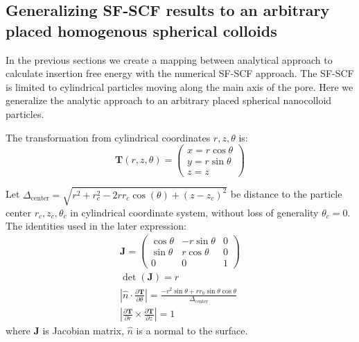 \documentclass[10pt, a4paper]{article}
\newcommand\todo[1]{\textcolor{red}{#1}}
\begin{document}
\subsection*{Generalizing SF-SCF results to an arbitrary placed homogenous spherical colloids}
\begin{multicols}{2}

In the previous sections we create a mapping between analytical approach to calculate insertion free energy with the numerical SF-SCF approach. The SF-SCF is limited to cylindrical particles moving along the main axis of the pore.
Here we generalize the analytic approach to an arbitrary placed spherical nanocolloid particles.



The transformation from cylindrical coordinates $r, z, \theta$ is:
\begin{equation}
    \bm{T}(r, z, \theta) = 
    \begin{pmatrix}
        x = r \cos \theta\\
        y = r \sin \theta\\
        z = z
    \end{pmatrix}
\end{equation}

Let $\Delta_{\textrm{center}} = \sqrt{r^2 + r_c^2 - 2 r r_c \cos(\theta) + (z-z_c)^2}$ be distance to the particle center $r_c, z_c, \theta_c$ in cylindrical coordinate system, without loss of generality $\theta_c = 0$.
The identities used in the later expression:
\begin{gather}
    \bm{J} = 
    \begin{pmatrix}
        \cos{\theta} & -r\sin\theta & 0 \\
        \sin{\theta} &  r\cos\theta & 0 \\
        0           & 0            & 1
    \end{pmatrix}\\
    \det(\bm{J}) = r \\
    \left| \hat{n} \cdot \frac{\partial \bm{T}}{\partial \theta} \right| = \frac{-r^2 \sin \theta + rr_0 \sin \theta \cos \theta}{\Delta_{\textrm{center}}}\\
    \left| \frac{\partial \bm{T}}{\partial r} \times \frac{\partial \bm{T}}{\partial z} \right| = 1
\end{gather}
where $\bm{J}$ is Jacobian matrix, $\hat{n}$ is a normal to the surface.


\end{multicols}
\end{document}
